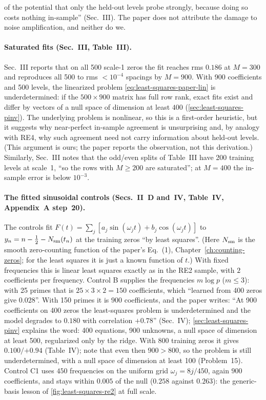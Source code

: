 of the potential that only the held-out levels probe strongly, because doing so costs nothing in-sample'' (Sec.~III). The paper does not attribute the damage to noise amplification, and neither do we.

\paragraph{Saturated fits (Sec.~III, Table~III).} Sec.~III reports that on all 500 scale-1 zeros the fit reaches rms $0.186$ at $M = 300$ and reproduces all 500 to rms $<10^{-4}$ spacings by $M = 900$. With 900 coefficients and 500 levels, the linearized problem \cref{eq:least-squares-paper-lin} is underdetermined: if the $500\times900$ matrix has full row rank, exact fits exist and differ by vectors of a null space of dimension at least $400$ (\cref{sec:least-squares-pinv}). The underlying problem is nonlinear, so this is a first-order heuristic, but it suggests why near-perfect in-sample agreement is unsurprising and, by analogy with RE4, why such agreement need not carry information about held-out levels. (This argument is ours; the paper reports the observation, not this derivation.) Similarly, Sec.~III notes that the odd/even splits of Table~III have 200 training levels at scale~1, ``so the rows with $M \ge 200$ are saturated''; at $M = 400$ the in-sample error is below $10^{-3}$.

\paragraph{The fitted sinusoidal controls (Secs.~II~D and~IV, Table~IV, Appendix~A step~20).} The controls fit $F(t) = \sum_j[a_j\sin(\omega_jt)+b_j\cos(\omega_jt)]$ to $y_n = n-\tfrac12 - N_{\mathrm{sm}}(t_n)$ at the training zeros ``by least squares''. (Here $N_{\mathrm{sm}}$ is the smooth zero-counting function of the paper's Eq.~(1), Chapter~\ref{ch:counting-zeros}; for the least squares it is just a known function of $t$.) With fixed frequencies this is linear least squares exactly as in the RE2 sample, with $2$ coefficients per frequency. Control B supplies the frequencies $m\log p$ ($m\le3$): with 25 primes that is $25\times3\times2 = 150$ coefficients, which ``learned from 400 zeros give $0.028$''. With 150 primes it is $900$ coefficients, and the paper writes: ``At 900 coefficients on 400 zeros the least-squares problem is underdetermined and the model degrades to $0.180$ with correlation $+0.78$'' (Sec.~IV); \cref{sec:least-squares-pinv} explains the word: 400 equations, 900 unknowns, a null space of dimension at least 500, regularized only by the ridge. With 800 training zeros it gives $0.100/{+0.94}$ (Table~IV); note that even then $900 > 800$, so the problem is still underdetermined, with a null space of dimension at least 100 (Problem~15). Control C1 uses $450$ frequencies on the uniform grid $\omega_j = 8j/450$, again $900$ coefficients, and stays within $0.005$ of the null ($0.258$ against $0.263$): the generic-basis lesson of \cref{fig:least-squares-re2} at full scale.

